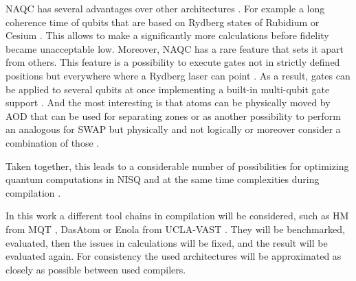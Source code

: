 \ac{NAQC} has several advantages over other architectures \parencite{schmid2023hybridcircuitmappingleveraging}.
For example a long coherence time of qubits that are based on Rydberg states of Rubidium or Cesium \parencite{Schmid_2024_NeutralAtomBasics}.
This allows to make a significantly more calculations before fidelity became unacceptable low. 
Moreover, \ac{NAQC} has a rare feature that sets it apart from others.
This feature is a possibility to execute gates not in strictly defined positions but everywhere where a Rydberg laser can point \parencite{Henriet_2020,Schmid_2024_NeutralAtomBasics}.
As a result, gates can be applied to several qubits at once implementing a built-in multi-qubit gate support \parencite{Wintersperger_2023,Henriet_2020,Schmid_2024_NeutralAtomBasics, Levine_2019}.
And the most interesting is that atoms can be physically moved by \ac{AOD} 
that can be used for separating zones or as another possibility 
to perform an analogous for SWAP but physically and not logically or moreover consider a combination of those \parencite{Wintersperger_2023, schmid2023hybridcircuitmappingleveraging}.

Taken together, this leads to a considerable number of possibilities for optimizing quantum computations in \ac{NISQ}
and at the same time complexities during compilation \parencite{huang2024qubitmappingadaptivedivideandconquer, huang2025dasatomdivideandshuttleatomapproach, Tan_2025_Enola, Schmid_2024_NeutralAtomBasics, schmid2023hybridcircuitmappingleveraging, 10082942}.

In this work a different tool chains in compilation will be considered, such as \ac{HM} from \ac{MQT} \parencite{schmid2023hybridcircuitmappingleveraging}, 
DasAtom \parencite{huang2025dasatomdivideandshuttleatomapproach} or Enola from \ac{UCLA-VAST} \parencite{Tan_2025_Enola}.
They will be benchmarked, evaluated, then the issues in calculations \parencite{gao2025optimalcompilationstrategiesqft} will be fixed, and the result will be evaluated again.
For consistency the used architectures will be approximated as closely as possible between used compilers.